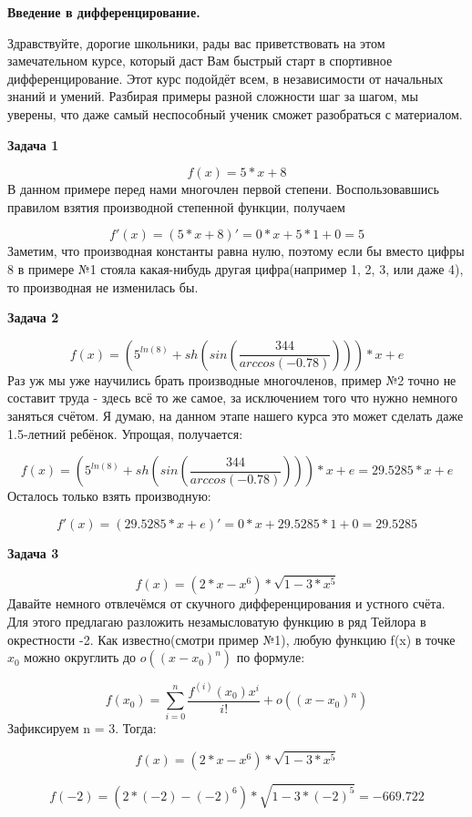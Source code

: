 \documentclass[12pt,a5paper,fleqn]{article}
\begin{document}
\begin{center}
{\bf \Large
Введение в дифференцирование.
}
\end{center}
Здравствуйте, дорогие школьники, рады вас приветствовать на этом замечательном курсе, который даст Вам быстрый старт в спортивное дифференцирование. Этот курс подойдёт всем, в независимости от начальных знаний и умений. Разбирая примеры разной сложности шаг за шагом, мы уверены, что даже самый неспособный ученик сможет разобраться с материалом.


\newpage
{\bf \Large
Задача 1
}

$$
f(x)=5* x+8
$$
В данном примере перед нами многочлен первой степени. Воспользовавшись правилом взятия производной степенной функции, получаем

$$
f'(x)=(5* x+8)'=0* x+5*1+0=5
$$
Заметим, что производная константы равна нулю, поэтому если бы вместо цифры 8 в примере №1 стояла какая-нибудь другая цифра(например 1, 2, 3, или даже 4), то производная не изменилась бы.

{\bf \Large
Задача 2
}

$$
f(x)=\left(5^{ ln\left(8\right)}+ sh\left( sin\left(\frac{344}{ arccos\left(-0.78\right)}\right)\right)\right)* x+e
$$
Раз уж мы уже научились брать производные многочленов, пример №2 точно не составит труда - здесь всё то же самое, за исключением того что нужно немного заняться счётом. Я думаю, на данном этапе нашего курса это может сделать даже 1.5-летний ребёнок. Упрощая, получается:

$$
f(x)=\left(5^{ ln\left(8\right)}+ sh\left( sin\left(\frac{344}{ arccos\left(-0.78\right)}\right)\right)\right)* x+e=29.5285* x+e
$$
Осталось только взять производную:

$$
f'(x)=(29.5285* x+e)'=0* x+29.5285*1+0=29.5285
$$

\newpage
{\bf \Large
Задача 3
}

$$
f(x)=\left(2* x- x^{6}\right)*\sqrt{1-3* x^{5}}
$$
Давайте немного отвлечёмся от скучного дифференцирования и устного счёта. Для этого предлагаю разложить незамысловатую функцию в ряд Тейлора в окрестности -2.
Как известно(смотри пример №1), любую функцию f(x) в точке $x_{0}$ можно округлить до $o((x-x_{0})^{n})$ по формуле:

$$
f(x_{0})=\sum_{i=0}^{n}\frac{f^{(i)}(x_{0})x^i}{i!} + o((x-x_{0})^{n})
$$
Зафиксируем n = 3. Тогда:

$$
f(x)=\left(2* x- x^{6}\right)*\sqrt{1-3* x^{5}}
$$

$$
f(-2)=\left(2*(-2)-(-2)^{6}\right)*\sqrt{1-3*(-2)^{5}}=-669.722
$$
\end{document}
